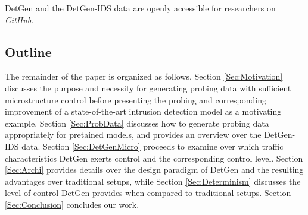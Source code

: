\documentclass[runningheads]{llncs}
\begin{document}
%
%
%
%
%
%


DetGen and the DetGen-IDS data are openly accessible for researchers on \textit{GitHub}.


\subsection{Outline}

The remainder of the paper is organized as follows. Section \ref{Sec:Motivation} discusses the purpose and necessity for generating probing data with sufficient microstructure control before presenting the probing and corresponding improvement of a state-of-the-art intrusion detection model as a motivating example. Section \ref{Sec:ProbData} discusses how to generate probing data appropriately for pretained models, and provides an overview over the DetGen-IDS data.
Section \ref{Sec:DetGenMicro} proceeds to examine over which traffic characteristics DetGen exerts control and the corresponding control level.
Section \ref{Sec:Archi} provides details over the design paradigm of DetGen and the resulting advantages over traditional setups, while Section \ref{Sec:Determinism} discusses the level of control DetGen provides when compared to traditional setups.
 Section \ref{Sec:Conclusion} concludes our work.
\end{document}
